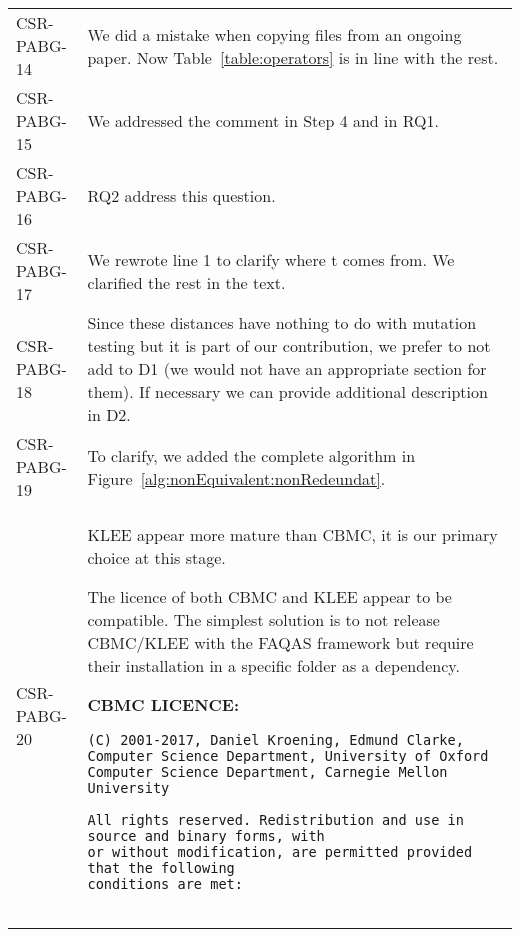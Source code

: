 \begin{longtable}{|p{1.5cm}|p{12cm}|@{}}
\begin{minipage}{12cm}
\end{minipage}\\
\hline
CSR-PABG-14&
\begin{minipage}{12cm}
We did a mistake when copying files from an ongoing paper. Now Table~\ref{table:operators} is in line with the rest.
\end{minipage}\\
\hline
CSR-PABG-15&
\begin{minipage}{12cm}
We addressed the comment in Step 4 and in RQ1.
\end{minipage}\\
\hline
CSR-PABG-16&
\begin{minipage}{12cm}
RQ2 address this question.
\end{minipage}\\
\hline
CSR-PABG-17&
\begin{minipage}{12cm}
We rewrote line 1 to clarify where t comes from.
We clarified the rest in the text.
\end{minipage}\\
\hline
CSR-PABG-18&
\begin{minipage}{12cm}
Since these distances have nothing to do with mutation testing but it is part of our contribution, we prefer to not add to D1 (we would not have an appropriate section for them). If necessary we can provide additional description in D2.
\end{minipage}\\
\hline
CSR-PABG-19&
\begin{minipage}{12cm}
To clarify, we added the complete algorithm in Figure~\ref{alg:nonEquivalent:nonRedeundat}.
\end{minipage}\\
\hline
CSR-PABG-20&
\begin{minipage}{12cm}
KLEE appear more mature than CBMC, it is our primary choice at this stage.

The licence of both CBMC and KLEE appear to be compatible. The simplest solution is to not release CBMC/KLEE with the FAQAS framework but require their installation in a specific folder as a dependency. 

\textbf{CBMC LICENCE:}

\begin{verbatim}
(C) 2001-2017, Daniel Kroening, Edmund Clarke,
Computer Science Department, University of Oxford
Computer Science Department, Carnegie Mellon University

All rights reserved. Redistribution and use in source and binary forms, with
or without modification, are permitted provided that the following
conditions are met:


\end{verbatim}
\end{minipage}
\end{longtable}
